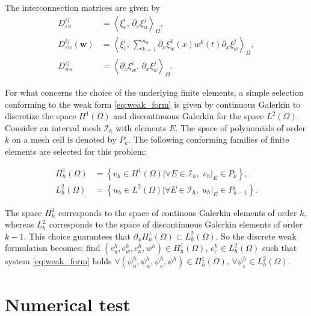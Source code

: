 \documentclass{ifacconf}
\newcommand{\inner}[3][]{\ensuremath{\left\langle #2, \, #3 \right\rangle_{#1}}}
\begin{document}
The interconnection matrices are given by 
\begin{equation}
	\begin{aligned}
	D_{\varepsilon u}^{ij} &= \inner[\Omega]{\xi_\varepsilon^i}{\partial_x \xi_u^j}, \\
	D_{\varepsilon w}^{ij}(\mathbf{w}) &= \inner[\Omega]{\xi_\varepsilon^i}{ \sum_{k=1}^{n_w} \partial_x \xi_w^k(x) w^k(t) \partial_x \xi_w^j}, \\
	D_{w \kappa}^{ij} &= \inner[\Omega]{\partial_x \xi_w^i}{\partial_x \xi_\kappa^j}.
	\end{aligned}
\end{equation}


For what concerns the choice of the underlying finite elements, a simple selection conforming to the weak form \eqref{eq:weak_form} is given by continuous Galerkin to discretize the space $H^1(\Omega)$ and discontinuous Galerkin for the space $L^2(\Omega)$. Consider an interval mesh $\mathcal{I}_h$ with elements $E$. The space of polynomials of order $k$ on a mesh cell is denoted by $P_k$. The following conforming families of finite elements are selected for this problem:

\begin{equation}
	\begin{aligned}
		H^1_h(\Omega) &= \left\{v_h \in H^1(\Omega)\vert \forall E \in \mathcal{I}_h, \; v_h\vert_E \in P_k \right\}, \\
		L^2_h(\Omega) &= \left\{u_h \in L^2(\Omega)\vert \forall E \in \mathcal{I}_h, \; u_h\vert_E \in P_{k-1} \right\}.
	\end{aligned}
\end{equation}

The space $H^1_h$ corresponds to the space of continous Galerkin elements of order $k$, whereas $L^2_h$ corresponds to the space of discontinuous Galerkin elements of order $k-1$. This choice guarantees that $\partial_x H^1_h(\Omega) \subset L^2_h(\Omega)$. So the discrete weak formulation becomes: find $(e_u^h, e_w^h, e_\kappa^h, w^h) \in H^1_h(\Omega), \, e_\varepsilon^h \in L_h^2(\Omega)$
such that system \eqref{eq:weak_form} holds $\forall (\psi_u^h, \psi_w^h, \psi_\kappa^h, \psi^h) \in H^1_h(\Omega), \, \forall \psi_\varepsilon^h \in L^2_h(\Omega)$.

\section{Numerical test}\label{sec:num_test}
\end{document}
